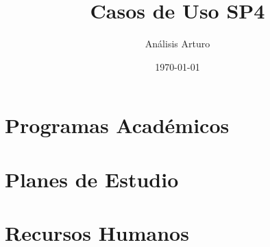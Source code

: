 \documentclass[12pt]{report}
\title{Casos de Uso SP4}
\author{Análisis Arturo}
\date{\today}
\begin{document}
\maketitle
\thispagestyle{empty}
\tableofcontents


\chapter{Programas Académicos}



\chapter{Planes de Estudio}





%
%
\chapter{Recursos Humanos}




\end{document}
